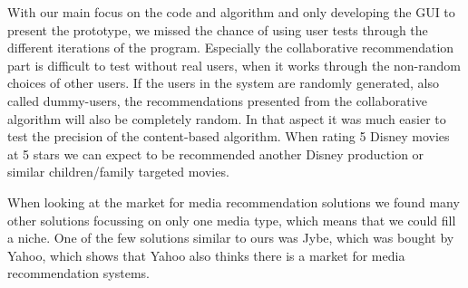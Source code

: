 With our main focus on the code and algorithm and only developing the GUI to present the prototype, we missed the chance of using user tests through the different iterations of the program. Especially the collaborative recommendation part is difficult to test without real users, when it works through the non-random choices of other users. If the users in the system are randomly generated, also called dummy-users, the recommendations presented from the collaborative algorithm will also be completely random. In that aspect it was much easier to test the precision of the content-based algorithm. When rating 5 Disney movies at 5 stars we can expect to be recommended another Disney production or similar children/family targeted movies.

When looking at the market for media recommendation solutions we found many other solutions focussing on only one media type, which means that we could fill a niche. One of the few solutions similar to ours was Jybe, which was bought by Yahoo, which shows that Yahoo also thinks there is a market for media recommendation systems. \cite{Jybe}